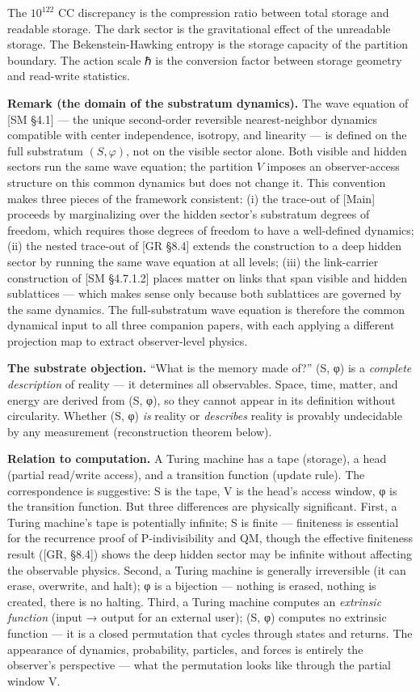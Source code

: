 \documentclass[
]{article}
\begin{document}
The \(10^{122}\) CC discrepancy is the compression ratio between total
storage and readable storage. The dark sector is the gravitational
effect of the unreadable storage. The Bekenstein-Hawking entropy is the
storage capacity of the partition boundary. The action scale ℏ is the
conversion factor between storage geometry and read-write statistics.

\textbf{Remark (the domain of the substratum dynamics).} The wave
equation of {[}SM §4.1{]} --- the unique second-order reversible
nearest-neighbor dynamics compatible with center independence, isotropy,
and linearity --- is defined on the full substratum \((S, \varphi)\),
not on the visible sector alone. Both visible and hidden sectors run the
same wave equation; the partition \(V\) imposes an observer-access
structure on this common dynamics but does not change it. This
convention makes three pieces of the framework consistent: (i) the
trace-out of {[}Main{]} proceeds by marginalizing over the hidden
sector's substratum degrees of freedom, which requires those degrees of
freedom to have a well-defined dynamics; (ii) the nested trace-out of
{[}GR §8.4{]} extends the construction to a deep hidden sector by
running the same wave equation at all levels; (iii) the link-carrier
construction of {[}SM §4.7.1.2{]} places matter on links that span
visible and hidden sublattices --- which makes sense only because both
sublattices are governed by the same dynamics. The full-substratum wave
equation is therefore the common dynamical input to all three companion
papers, with each applying a different projection map to extract
observer-level physics.

\textbf{The substrate objection.} ``What is the memory made of?'' (S, φ)
is a \emph{complete description} of reality --- it determines all
observables. Space, time, matter, and energy are derived from (S, φ), so
they cannot appear in its definition without circularity. Whether (S, φ)
\emph{is} reality or \emph{describes} reality is provably undecidable by
any measurement (reconstruction theorem below).

\textbf{Relation to computation.} A Turing machine has a tape (storage),
a head (partial read/write access), and a transition function (update
rule). The correspondence is suggestive: S is the tape, V is the head's
access window, φ is the transition function. But three differences are
physically significant. First, a Turing machine's tape is potentially
infinite; S is finite --- finiteness is essential for the recurrence
proof of P-indivisibility and QM, though the effective finiteness result
({[}GR, §8.4{]}) shows the deep hidden sector may be infinite without
affecting the observable physics. Second, a Turing machine is generally
irreversible (it can erase, overwrite, and halt); φ is a bijection ---
nothing is erased, nothing is created, there is no halting. Third, a
Turing machine computes an \emph{extrinsic function} (input → output for
an external user); (S, φ) computes no extrinsic function --- it is a
closed permutation that cycles through states and returns. The
appearance of dynamics, probability, particles, and forces is entirely
the observer's perspective --- what the permutation looks like through
the partial window V.
\end{document}
